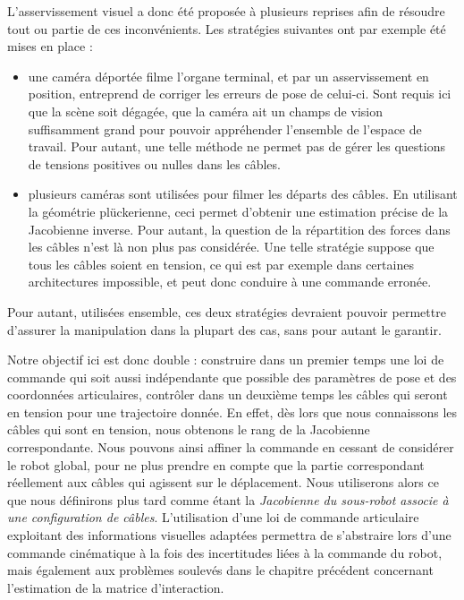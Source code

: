 L'asservissement visuel a donc été proposée à plusieurs reprises afin de résoudre tout ou partie de ces inconvénients. Les stratégies suivantes ont par exemple été mises en place :
\begin{itemize}
 \item une caméra déportée filme l'organe terminal, et par un asservissement en position, entreprend de corriger les erreurs de pose de celui-ci. Sont requis ici que la scène soit dégagée, que la caméra ait un champs de vision suffisamment grand pour pouvoir appréhender l'ensemble de l'espace de travail. Pour autant, une telle méthode ne permet pas de gérer les questions de tensions positives ou nulles dans les câbles.
 \item plusieurs caméras sont utilisées pour filmer les départs des câbles. En utilisant la géométrie plückerienne, ceci permet d'obtenir une estimation précise de la Jacobienne inverse. Pour autant, la question de la répartition des forces dans les câbles n'est là non plus pas considérée. Une telle stratégie suppose que tous les câbles soient en tension, ce qui est par exemple dans certaines architectures impossible, et peut donc conduire à une commande erronée. 
\end{itemize}

Pour autant, utilisées ensemble, ces deux stratégies devraient pouvoir permettre d'assurer la manipulation dans la plupart des cas, sans pour autant le garantir.

Notre objectif ici est donc double : construire dans un premier temps une loi de commande qui soit aussi indépendante que possible des paramètres de pose et des coordonnées articulaires, contrôler dans un deuxième temps les câbles qui seront en tension pour une trajectoire donnée. En effet, dès lors que nous connaissons les câbles qui sont en tension, nous obtenons le rang de la Jacobienne correspondante. Nous pouvons ainsi affiner la commande en cessant de considérer le robot global, pour ne plus prendre en compte que la partie correspondant réellement aux câbles qui agissent sur le déplacement. Nous utiliserons alors ce que nous définirons plus tard comme étant la {\it Jacobienne du sous-robot associe à une configuration de câbles}. L'utilisation d'une loi de commande articulaire exploitant des informations visuelles adaptées permettra de s'abstraire lors d'une commande cinématique à la fois des incertitudes liées à la commande du robot, mais également aux problèmes soulevés dans le chapitre précédent concernant l'estimation de la matrice d'interaction.

